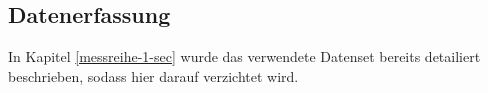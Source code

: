 \subsection{Datenerfassung} \label{datenerfassung-1-subsec}


In Kapitel \ref{messreihe-1-sec} wurde das verwendete Datenset bereits detailiert beschrieben, sodass hier darauf verzichtet wird. \\